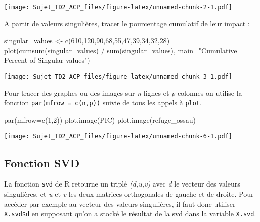\documentclass[
]{article}
\newenvironment{Shaded}{\begin{snugshade}}{\end{snugshade}}
\newcommand{\AttributeTok}[1]{\textcolor[rgb]{0.77,0.63,0.00}{#1}}
\newcommand{\DecValTok}[1]{\textcolor[rgb]{0.00,0.00,0.81}{#1}}
\newcommand{\FunctionTok}[1]{\textcolor[rgb]{0.00,0.00,0.00}{#1}}
\newcommand{\NormalTok}[1]{#1}
\newcommand{\OtherTok}[1]{\textcolor[rgb]{0.56,0.35,0.01}{#1}}
\newcommand{\SpecialCharTok}[1]{\textcolor[rgb]{0.00,0.00,0.00}{#1}}
\newcommand{\StringTok}[1]{\textcolor[rgb]{0.31,0.60,0.02}{#1}}
\begin{document}
\texttt{[image: Sujet\_TD2\_ACP\_files/figure-latex/unnamed-chunk-2-1.pdf]}

A partir de valeurs singulières, tracer le pourcentage cumulatif de leur
impact :

\begin{Shaded}
\begin{Highlighting}[]
\NormalTok{singular\_values }\OtherTok{\textless{}{-}} \FunctionTok{c}\NormalTok{(}\DecValTok{610}\NormalTok{,}\DecValTok{120}\NormalTok{,}\DecValTok{90}\NormalTok{,}\DecValTok{68}\NormalTok{,}\DecValTok{55}\NormalTok{,}\DecValTok{47}\NormalTok{,}\DecValTok{39}\NormalTok{,}\DecValTok{34}\NormalTok{,}\DecValTok{32}\NormalTok{,}\DecValTok{28}\NormalTok{)}
\FunctionTok{plot}\NormalTok{(}\FunctionTok{cumsum}\NormalTok{(singular\_values) }\SpecialCharTok{/} \FunctionTok{sum}\NormalTok{(singular\_values), }
     \AttributeTok{main=}\StringTok{"Cumulative Percent of Singular values"}\NormalTok{)}
\end{Highlighting}
\end{Shaded}

\texttt{[image: Sujet\_TD2\_ACP\_files/figure-latex/unnamed-chunk-3-1.pdf]}

Pour tracer des graphes ou des images sur \emph{n} lignes et \emph{p}
colonnes on utilise la fonction \texttt{par(mfrow\ =\ c(n,p))} suivie de
tous les appels à \texttt{plot}.

\begin{Shaded}
\begin{Highlighting}[]
\FunctionTok{par}\NormalTok{(}\AttributeTok{mfrow=}\FunctionTok{c}\NormalTok{(}\DecValTok{1}\NormalTok{,}\DecValTok{2}\NormalTok{))}
\FunctionTok{plot.image}\NormalTok{(PIC)}
\FunctionTok{plot.image}\NormalTok{(refuge\_ossau)}
\end{Highlighting}
\end{Shaded}

\texttt{[image: Sujet\_TD2\_ACP\_files/figure-latex/unnamed-chunk-6-1.pdf]}

\hypertarget{fonction-svd}{%
\subsection{Fonction SVD}\label{fonction-svd}}

La fonction \texttt{svd} de R retourne un triplé \emph{(d,u,v)} avec
\emph{d} le vecteur des valeurs singulières, et \emph{u} et \emph{v} les
deux matrices orthogonales de gauche et de droite. Pour accéder par
exemple au vecteur des valeurs singulières, il faut donc utiliser
\texttt{X.svd\$d} en supposant qu'on a stocké le résultat de la svd dans
la variable \texttt{X.svd}.
\end{document}
